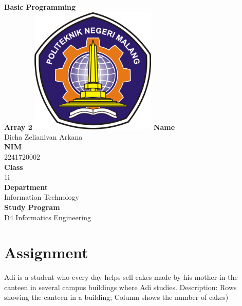 \documentclass[12pt,titlepage]{article}
\newcommand{\vSubject}{Basic Programming}
\newcommand{\vSubtitle}{Array 2}
\newcommand{\vName}{Dicha Zelianivan Arkana}
\newcommand{\vNIM}{2241720002}
\newcommand{\vClass}{1i}
\newcommand{\vDepartment}{Information Technology}
\newcommand{\vStudyProgram}{D4 Informatics Engineering}
\begin{document}
\begin{titlepage}
    \centering
    \vfill
    {\bfseries\LARGE
        \vSubject\\
        \vskip0.25cm
        \vSubtitle
    }
    \vfill
    \includegraphics[width=6cm]{images/polinema-logo.png}
    \vfill
    {
        \textbf{Name}\\
        \vName\\
        \vskip0.5cm
        \textbf{NIM}\\
        \vNIM\\
        \vskip0.5cm
        \textbf{Class}\\
        \vClass\\
        \vskip0.5cm
        \textbf{Department}\\
        \vDepartment\\
        \vskip0.5cm
        \textbf{Study Program}\\
        \vStudyProgram
    }
\end{titlepage}

\section*{Assignment}
Adi is a student who every day helps sell cakes made by his mother in the canteen
in several campus buildings where Adi studies. Description: Rows showing the
canteen in a building; Column shows the number of cakes)
\end{document}
